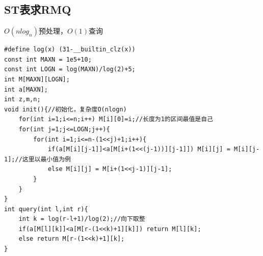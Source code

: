 \documentclass[a4]{ctexart}
\begin{document}
\subsection{ST表求RMQ}
$O(nlog_n)$预处理，$O(1)$查询
\begin{lstlisting}
#define log(x) (31-__builtin_clz(x))
const int MAXN = 1e5+10;
const int LOGN = log(MAXN)/log(2)+5;
int M[MAXN][LOGN]; 
int a[MAXN];
int z,m,n;
void init(){//初始化，复杂度O(nlogn) 
	for(int i=1;i<=n;i++) M[i][0]=i;//长度为1的区间最值是自己 
	for(int j=1;j<=LOGN;j++){
		for(int i=1;i<=n-(1<<j)+1;i++){
			if(a[M[i][j-1]]<a[M[i+(1<<(j-1))][j-1]]) M[i][j] = M[i][j-1];//这里以最小值为例 
			else M[i][j] = M[i+(1<<j-1)][j-1];
		}
	} 
}
int query(int l,int r){
	int k = log(r-l+1)/log(2);//向下取整
	if(a[M[l][k]]<a[M[r-(1<<k)+1][k]]) return M[l][k];
	else return M[r-(1<<k)+1][k];
}
\end{lstlisting}

\begin{lstlisting}

\end{lstlisting}
\end{document}
